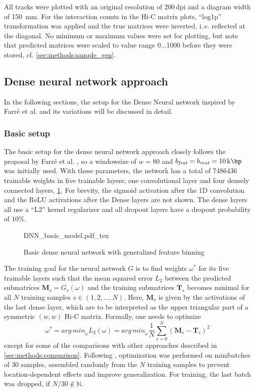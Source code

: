 All tracks were plotted with an original resolution of 200\,dpi and a diagram width of \SI{150}{\mm}.
For the interaction counts in the Hi-C matrix plots, ``log1p'' transformation was applied and the true matrices were inverted,
i.\,e. reflected at the diagonal. 
No minimum or maximum values were set for plotting, but note that predicted matrices were scaled to value range 0...1000 
before they were stored, cf. \cref{sec:methods:sample_gen}.

\subsection{Dense neural network approach} \label{sec:methods:dnn}
In the following sections, the setup for the Dense Neural network inspired by Farr\'e et al. \cite{Farre2018a}
and its variations will be discussed in detail.

\subsubsection{Basic setup} \label{sec:methods:basicSetup}
The basic setup for the dense neural network approach closely follows the proposal by Farr\'e et al. \cite{Farre2018a},
so a windowsize of $w=80$ and $b_\mathit{feat}=b_\mathit{mat} = \SI{10}{\kilo\bp}$ was initially used.
With these parameters, the network has a total of \SI{7486436}{} trainable weights in five trainable layers; 
one convolutional layer and four densely connected layers, \cref{fig:methods:basic_dnn}.
For brevity, the sigmoid activation after the 1D convolution and the ReLU activations after the Dense layers are not shown.
The dense layers all use a ``L2'' kernel regularizer and all dropout layers have a dropout probability of $10\%$.
\begin{figure}[htb]
    \small
    \centering
    {DNN_basic_model.pdf_tex}
    \caption{Basic dense neural network with generalized feature binning}
    \label{fig:methods:basic_dnn}
\end{figure}

The training goal for the neural network $G$ is to find weights $\omega^*$ for its five trainable layers 
such that the mean squared error $L_2$ between the predicted submatrices $\mathbf{M}_s = G_s(\omega)$ 
and the training submatrices $\mathbf{T}_s$ becomes minimal for all $N$ training samples $s \in (1,2,\dots, N)$. 
Here, $\mathbf{M}_s$ is given by the activations of the last dense layer, which are to be interpreted as the upper triangular 
part of a symmetric $(w, w)$ Hi-C matrix.
Formally, one needs to optimize
\begin{equation}
 \omega^* = \mathit{arg\,min}_\omega L_2(\omega) = \mathit{arg\,min}_\omega \frac{1}{N} \sum_{s=0}^N (\mathbf{M}_s - \mathbf{T}_s)^2 \label{eq:methods:nn-mse}
\end{equation} 
except for some of the comparisons with other approaches described in \cref{sec:methods:comparison}.
Following \cite{Farre2018a}, optimization was performed on minibatches of 30 samples, assembled randomly from the $N$ training samples
to prevent location-dependent effects and improve generalization.
For training, the last batch was dropped, if $N/30 \not \in \mathbb{N}$. 

